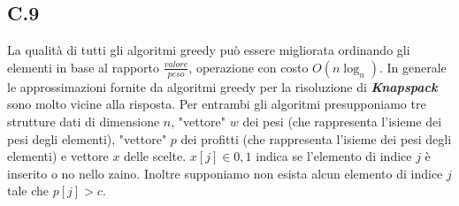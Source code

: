 \documentclass[a4paper]{article}
\newcommand{\imp}[1]{\textbf{\textit{#1}}}
\begin{document}
\subsection{C.9}
La qualità di tutti gli algoritmi greedy può essere migliorata ordinando gli elementi in base al rapporto $\frac{valore}{peso}$, operazione con costo $O(n\log_n)$.
In generale le approssimazioni fornite da algoritmi greedy per la risoluzione di \imp{Knapspack} sono molto vicine alla risposta. %
Per entrambi gli algoritmi presupponiamo tre strutture dati di dimensione $n$, "vettore" $w$ dei pesi (che rappresenta l'isieme dei pesi degli elementi), "vettore" $p$ dei profitti  (che rappresenta l'isieme dei pesi degli elementi) e vettore $x$ delle scelte. $x[j] \in {0,1}$ indica se l'elemento di indice $j$ è inserito o no nello zaino.
Inoltre supponiamo non esista alcun elemento di indice $j$ tale che $p[j] > c$.
\end{document}

